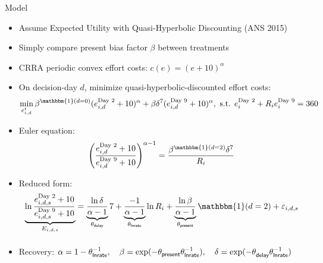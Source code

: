 \documentclass[professionalfont,10pt]{beamer}
\begin{document}
\begin{frame}{Model}
\begin{itemize}[<+->]
\item Assume Expected Utility with Quasi-Hyperbolic Discounting (ANS 2015)
\item Simply compare present bias factor $\beta$ between treatments
\item CRRA periodic convex effort costs: $c(e) = (e + 10)^\alpha$

\item On decision-day $d$, minimize quasi-hyperbolic-discounted effort costs:
$$\min_{e_{i,d}^t} \beta^{\mathbbm{1}(d=0)}(e_{i,d}^\text{Day 2}+10)^\alpha + \beta \delta^7 (e_{i,d}^\text{Day 9}+10)^\alpha, \text{ s.t. } e_i^\text{Day 2} + R_i e_i^\text{Day 9} = 360$$

\item Euler equation:
$$\left( \frac{e_{i,d}^\text{Day 2}+10}{e_{i,d}^\text{Day 9}+10} \right)^{\alpha-1} = \frac{\beta^{\mathbbm{1}(d=2)} \delta^7}{R_i}$$

\item Reduced form:
$$ \underbrace{ \ln \frac{e_{i,d,s}^\text{Day 2}+10}{e_{i,d,s}^\text{Day 9}+10} }_{E_{i,d,s}} = \underbrace{ \frac{\ln \delta}{\alpha - 1} }_{\theta_{\textsf{delay}}} 7 + \underbrace{ \frac{-1}{\alpha - 1} }_{\theta_{\textsf{lnrate}}} \ln R_i + \underbrace{ \frac{\ln \beta}{\alpha - 1} }_{\theta_{\textsf{present}}} \mathbbm{1}(d=2) + \varepsilon_{i,d,s}$$
\item Recovery: $\alpha=1-\theta_{\textsf{lnrate}}^{-1}, \quad \beta=\exp(-\theta_{\textsf{present}}^{\strut}\theta_{\textsf{lnrate}}^{-1}), \quad \delta=\exp(-\theta_{\textsf{delay}}^{\strut}\theta_{\textsf{lnrate}}^{-1})$
\end{itemize}
\end{frame}
\end{document}
